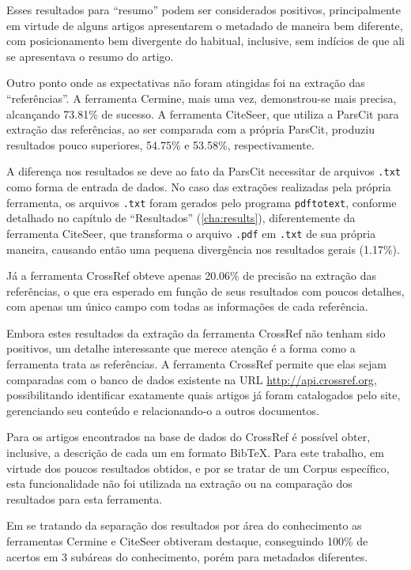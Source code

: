 Esses resultados para ``resumo'' podem ser considerados positivos, principalmente em virtude de alguns artigos apresentarem o metadado de maneira bem diferente, com posicionamento bem divergente do habitual, inclusive, sem indícios de que ali se apresentava o resumo do artigo.

Outro ponto onde as expectativas não foram atingidas foi na extração das ``referências''. A ferramenta Cermine, mais uma vez, demonstrou-se mais precisa, alcançando 73.81\% de sucesso. A ferramenta CiteSeer, que utiliza a ParsCit para extração das referências, ao ser comparada com a própria ParsCit, produziu resultados pouco superiores, 54.75\% e 53.58\%, respectivamente. 

A diferença nos resultados se deve ao fato da ParsCit necessitar de arquivos \texttt{.txt} como forma de entrada de dados. No caso das extrações realizadas pela própria ferramenta, os arquivos \texttt{.txt} foram gerados pelo programa \texttt{pdftotext}, conforme detalhado no capítulo de ``Resultados'' (\autoref{cha:results}), diferentemente da ferramenta CiteSeer, que transforma o arquivo \texttt{.pdf} em \texttt{.txt} de sua própria maneira, causando então uma pequena divergência nos resultados gerais (1.17\%). 

Já a ferramenta CrossRef obteve apenas 20.06\% de precisão na extração das referências, o que era esperado em função de seus resultados com poucos detalhes, com apenas um único campo com todas as informações de cada referência.

Embora estes resultados da extração da ferramenta CrossRef não tenham sido positivos, um detalhe interessante que merece atenção é a forma como a ferramenta trata as referências. A ferramenta CrossRef permite que elas sejam comparadas com o banco de dados existente na URL \url{http://api.crossref.org}, possibilitando identificar exatamente quais artigos já foram catalogados pelo site, gerenciando seu conteúdo e relacionando-o a outros documentos. 

Para os artigos encontrados na base de dados do CrossRef é possível obter, inclusive, a descrição de cada um em formato BibTeX. Para este trabalho, em virtude dos poucos resultados obtidos, e por se tratar de um Corpus específico, esta funcionalidade não foi utilizada na extração ou na comparação dos resultados para esta ferramenta.

Em se tratando da separação dos resultados por área do conhecimento as ferramentas Cermine e CiteSeer obtiveram destaque, conseguindo 100\% de acertos em 3 subáreas do conhecimento, porém para metadados diferentes.


